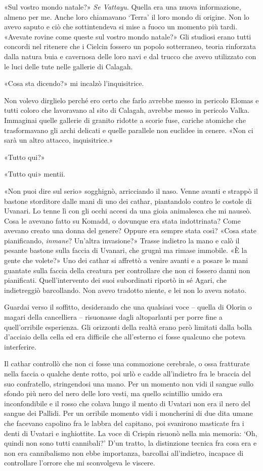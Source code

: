 «Sul vostro mondo natale?» \emph{Se Vattayu}. Quella era una nuova
informazione, almeno per me. Anche loro chiamavano `Terra' il loro mondo
di origine. Non lo avevo saputo e ciò che sottintendeva si mise a fuoco
un momento più tardi. «Avevate rovine come queste sul vostro mondo
natale?» Gli studiosi erano tutti concordi nel ritenere che i Cielcin
fossero un popolo sotterraneo, teoria rinforzata dalla natura buia e
cavernosa delle loro navi e dal trucco che avevo utilizzato con le luci
delle tute nelle gallerie di Calagah.

«Cosa sta dicendo?» mi incalzò l'inquisitrice.

Non volevo dirglielo perché ero certo che farlo avrebbe messo in
pericolo Elomas e tutti coloro che lavoravano al sito di Calagah,
avrebbe messo in pericolo Valka. Immaginai quelle gallerie di granito
ridotte a scorie fuse, cariche atomiche che trasformavano gli archi
delicati e quelle parallele non euclidee in cenere. «Non ci sarà un
altro attacco, inquisitrice.»

«Tutto qui?»

«Tutto qui» mentii.

«Non puoi dire sul serio» sogghignò, arricciando il naso. Venne avanti e
strappò il bastone storditore dalle mani di uno dei cathar, piantandolo
contro le costole di Uvanari. Lo tenne lì con gli occhi accesi da una
gioia animalesca che mi nauseò. Cosa le avevano fatto su Komadd, o
dovunque era stata indottrinata? Come avevano creato una donna del
genere? Oppure era sempre stata così? «Cosa state pianificando,
\emph{inmane}? Un'altra invasione?» Trasse indietro la mano e calò il
pesante bastone sulla faccia di Uvanari, che grugnì ma rimase immobile.
«È la gente che volete?» Uno dei cathar si affrettò a venire avanti e a
posare le mani guantate sulla faccia della creatura per controllare che
non ci fossero danni non pianificati. Quell'intervento dei suoi
subordinati riportò in sé Agari, che indietreggiò barcollando. Non avevo
tradotto niente, e lei non lo aveva notato.

Guardai verso il soffitto, desiderando che una qualsiasi voce -- quella
di Olorin o magari della cancelliera -- risuonasse dagli altoparlanti
per porre fine a quell'orribile esperienza. Gli orizzonti della realtà
erano però limitati dalla bolla d'acciaio della cella ed era difficile
che all'esterno ci fosse qualcuno che poteva interferire.

Il cathar controllò che non ci fosse una commozione cerebrale, o ossa
fratturate nella faccia o qualche dente rotto, poi urlò e cadde
all'indietro fra le braccia del suo confratello, stringendosi una mano.
Per un momento non vidi il sangue sullo sfondo più nero del nero delle
loro vesti, ma quello scintillio umido era inconfondibile e il rosso che
colava lungo il mento di Uvatari non era il nero del sangue dei Pallidi.
Per un orribile momento vidi i moncherini di due dita umane che facevano
capolino fra le labbra del capitano, poi svanirono masticate fra i denti
di Uvatari e inghiottite. La voce di Crispin risuonò nella mia memoria:
`Oh, quindi non sono tutti cannibali?' D'un tratto, la distinzione
tecnica fra cosa era e non era cannibalismo non ebbe importanza,
barcollai all'indietro, incapace di controllare l'orrore che mi
sconvolgeva le viscere.

